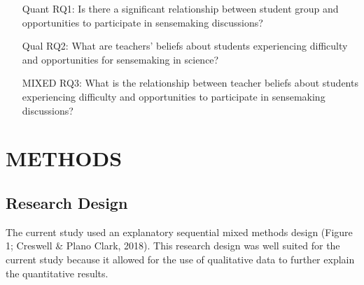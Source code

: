 \documentclass{sig-alternate} %
\begin{document}
\begin{large}
\begin{enumerate}[leftmargin = 1in]
    \item[Quant RQ1:] Is there a significant relationship between student group and opportunities to participate in sensemaking discussions?
    \item[Qual RQ2:] What are teachers’ beliefs about students experiencing difficulty and opportunities for sensemaking in science?
\end{enumerate}
\newpage
\begin{enumerate}[leftmargin = 1in]
    \item[MIXED RQ3:] What is the relationship between teacher beliefs about students experiencing difficulty and opportunities to participate in sensemaking discussions?
\end{enumerate}

\section*{METHODS}

\subsection*{Research Design}
The current study used an explanatory sequential mixed methods design (Figure 1; Creswell \& Plano Clark, 2018). This research design was well suited for the current study because it allowed for the use of qualitative data to further explain the quantitative results. 


\end{large}
\end{document}
